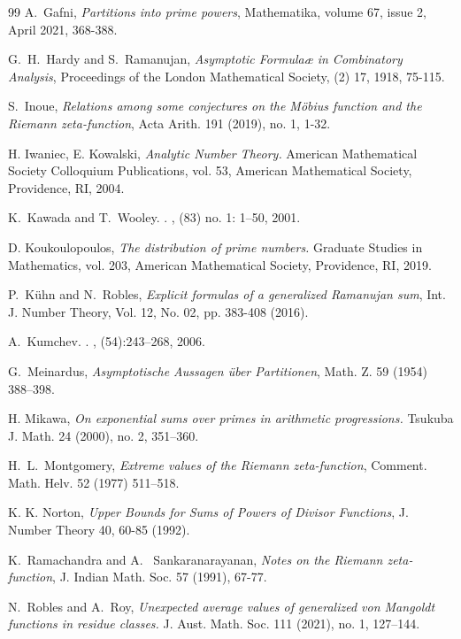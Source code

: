 \documentclass[11pt]{amsart}
\numberwithin{equation}{section}
\numberwithin{figure}{section}
\theoremstyle{definition}
\begin{document}
\begin{thebibliography}{99}
A.~Gafni, \emph{Partitions into prime powers}, Mathematika, volume 67, issue 2, April 2021, 368-388.

G.~H.~Hardy and S.~Ramanujan, \emph{Asymptotic Formulaæ in Combinatory Analysis}, Proceedings of the London Mathematical Society, (2) 17, 1918, 75-115.

S.~Inoue, {\it Relations among some conjectures on the M\"{o}bius function and the Riemann zeta-function}, Acta Arith. 191 (2019), no. 1, 1-32.

H. Iwaniec, E. Kowalski, \emph{Analytic Number Theory.} American Mathematical Society Colloquium Publications, vol. 53, American Mathematical Society, Providence, RI, 2004. 

K.~Kawada and T.~Wooley.
.
, (83) no. 1: 1--50, 2001.

D. Koukoulopoulos, \emph{The distribution of prime numbers.} Graduate Studies in Mathematics, vol. 203, American Mathematical Society, Providence, RI, 2019.

P.~K\"{u}hn and N.~Robles, \emph{Explicit formulas of a generalized Ramanujan sum}, Int. J. Number Theory, Vol. 12, No. 02, pp. 383-408 (2016).

A.~Kumchev.
.
, (54):243--268, 2006.

G.~Meinardus, \emph{Asymptotische Aussagen \"{u}ber Partitionen}, Math. Z. 59 (1954) 388–398.

H. Mikawa, \emph{On exponential sums over primes in arithmetic progressions.}
Tsukuba J. Math. 24 (2000), no. 2, 351--360.

H.~L.~Montgomery, \emph{Extreme values of the Riemann zeta-function},
Comment. Math. Helv. 52 (1977) 511–518.

K. K. Norton, \emph{Upper Bounds for Sums of Powers of Divisor Functions}, J. Number Theory 40, 60-85 (1992).

K.~Ramachandra and A.~ Sankaranarayanan, \emph{Notes on the Riemann zeta-function}, J. Indian Math.
Soc. 57 (1991), 67-77.

N.~Robles and A.~Roy, \emph{Unexpected average values of generalized von Mangoldt functions in residue classes.} 
J. Aust. Math. Soc. 111 (2021), no. 1, 127--144.


\end{thebibliography}
\end{document}
